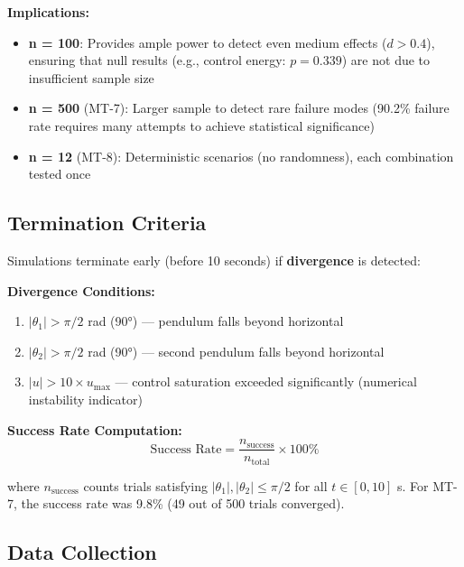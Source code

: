 \textbf{Implications:}
\begin{itemize}
    \item \textbf{n = 100}: Provides ample power to detect even medium effects ($d > 0.4$), ensuring that null results (e.g., control energy: $p=0.339$) are not due to insufficient sample size
    \item \textbf{n = 500} (MT-7): Larger sample to detect rare failure modes (90.2\% failure rate requires many attempts to achieve statistical significance)
    \item \textbf{n = 12} (MT-8): Deterministic scenarios (no randomness), each combination tested once
\end{itemize}

\subsection{Termination Criteria}
\label{subsec:termination_criteria}

Simulations terminate early (before 10 seconds) if \textbf{divergence} is detected:

\textbf{Divergence Conditions:}
\begin{enumerate}
    \item $|\theta_1| > \pi/2$ rad (90°) --- pendulum falls beyond horizontal
    \item $|\theta_2| > \pi/2$ rad (90°) --- second pendulum falls beyond horizontal
    \item $|u| > 10 \times u_{\max}$ --- control saturation exceeded significantly (numerical instability indicator)
\end{enumerate}

\textbf{Success Rate Computation:}
\begin{equation}
\label{eq:success_rate}
\text{Success Rate} = \frac{n_{\text{success}}}{n_{\text{total}}} \times 100\%
\end{equation}

where $n_{\text{success}}$ counts trials satisfying $|\theta_1|, |\theta_2| \leq \pi/2$ for all $t \in [0, 10]$ s. For MT-7, the success rate was 9.8\% (49 out of 500 trials converged).

\subsection{Data Collection}
\label{subsec:data_collection}

